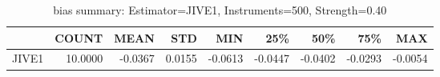 \begin{table}[ht]
\centering
\caption{bias summary: Estimator=JIVE1, Instruments=500, Strength=0.40}
\begin{tabular}{lrrrrrrrr}
\toprule
 & COUNT & MEAN & STD & MIN & 25\% & 50\% & 75\% & MAX \\
\midrule
JIVE1 & 10.0000 & -0.0367 & 0.0155 & -0.0613 & -0.0447 & -0.0402 & -0.0293 & -0.0054 \\
\bottomrule
\end{tabular}
\end{table}
